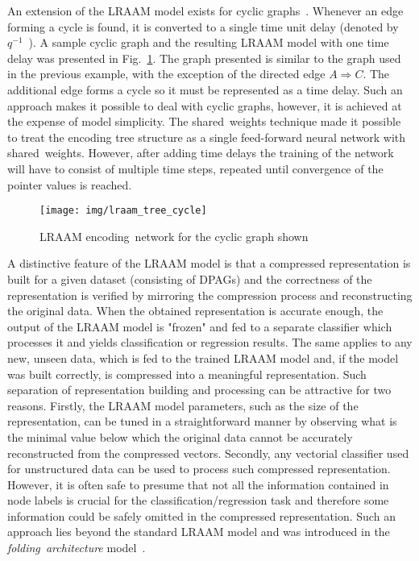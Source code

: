 An extension of the LRAAM model exists for cyclic graphs~\cite{goulon2005hopfield}. Whenever an edge forming a cycle is found, it is converted to a single time unit delay (denoted by $q^{-1}$~\cite{frasconi1998general}). A sample cyclic graph and the resulting LRAAM model with one time delay was presented in Fig.~\ref{fig:lraam_tree_cycle}. The graph presented is similar to the graph used in the previous example, with the exception of the directed edge $A \Rightarrow C$. The additional edge forms a cycle so it must be represented as a time delay. Such an approach makes it possible to deal with cyclic graphs, however, it is achieved at the expense of model simplicity. The shared~weights technique made it possible to treat the encoding tree structure as a single feed-forward neural network with shared~weights. However, after adding time delays the training of the network will have to consist of multiple time steps, repeated until convergence of the pointer values is reached.

\begin{figure}
\begin{center}
	\texttt{[image: img/lraam\_tree\_cycle]}
	\caption{LRAAM encoding~network for the cyclic graph shown}
	\label{fig:lraam_tree_cycle}
\end{center}
\end{figure}

A distinctive feature of the LRAAM model is that a compressed representation is built for a given dataset (consisting of DPAGs) and the correctness of the representation is verified by mirroring the compression process and reconstructing the original data. When the obtained representation is accurate enough, the output of the LRAAM model is "frozen" and fed to a separate classifier which processes it and yields classification or regression results. The same applies to any new, unseen data, which is fed to the trained LRAAM model and, if the model was built correctly, is compressed into a meaningful representation. Such separation of representation building and processing can be attractive for two reasons. Firstly, the LRAAM model parameters, such as the size of the representation, can be tuned in a straightforward manner by observing what is the minimal value below which the original data cannot be accurately reconstructed from the compressed vectors. Secondly, any vectorial classifier used for unstructured data can be used to process such compressed representation. However, it is often safe to presume that not all the information contained in node labels is crucial for the classification/regression task and therefore some information could be safely omitted in the compressed representation. Such an approach lies beyond the standard LRAAM model and was introduced in the \emph{folding~architecture} model~\cite{kuchler1996inductive}.


